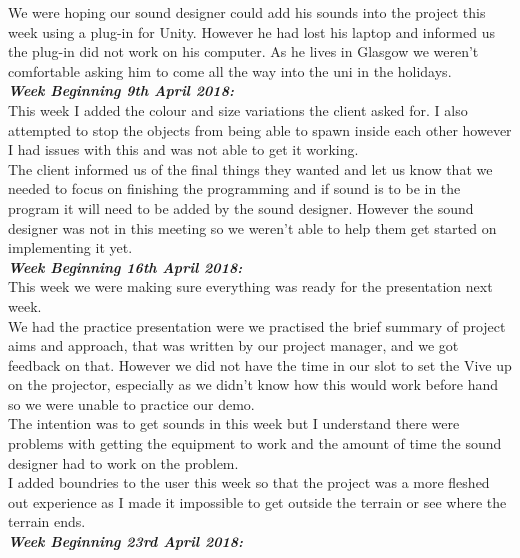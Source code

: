 \documentclass[10pt, a4paper]{article}
\begin{document}
    We were hoping our sound designer could add his sounds into the project this week using a plug-in for Unity. However he had lost his laptop and informed us the plug-in did not work on his computer. As he lives in Glasgow we weren't comfortable asking him to come all the way into the uni in the holidays.\\
    
    \textbf{\textit{Week Beginning 9th April 2018:}}\\
   	This week I added the colour and size variations the client asked for. I also attempted to stop the objects from being able to spawn inside each other however I had issues with this and was not able to get it working.\\
   	
   	The client informed us of the final things they wanted and let us know that we needed to focus on finishing the programming and if sound is to be in the program it will need to be added by the sound designer. However the sound designer was not in this meeting so we weren't able to help them get started on implementing it yet.\\
   	
    \textbf{\textit{Week Beginning 16th April 2018:}}\\
    This week we were making sure everything was ready for the presentation next week.\\
    
    We had the practice presentation were we practised the brief summary of project aims and approach, that was written by our project manager, and we got feedback on that. However we did not have the time in our slot to set the Vive up on the projector, especially as we didn't know how this would work before hand so we were unable to practice our demo.\\
    
    The intention was to get sounds in this week but I understand there were problems with getting the equipment to work and the amount of time the sound designer had to work on the problem.\\
    
    I added boundries to the user this week so that the project was a more fleshed out experience as I made it impossible to get outside the terrain or see where the terrain ends.\\
    
    \textbf{\textit{Week Beginning 23rd April 2018:}}\\
    
\end{document}
